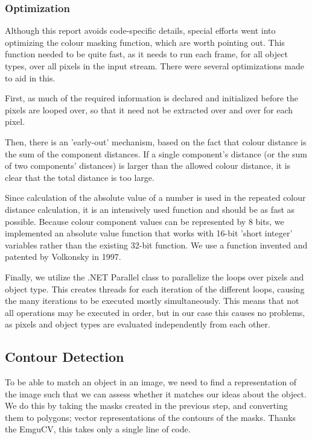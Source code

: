 \documentclass[10pt,twocolumn]{article}
\begin{document}
\subsubsection{Optimization}
Although this report avoids code-specific details, special efforts went into optimizing the colour masking function, which are worth pointing out. This function needed to be quite fast, as it needs to run each frame, for all object types, over all pixels in the input stream. There were several optimizations made to aid in this.

First, as much of the required information is declared and initialized before the pixels are looped over, so that it need not be extracted over and over for each pixel.

Then, there is an 'early-out' mechanism, based on the fact that colour distance is the sum of the component distances. If a single component's distance (or the sum of two components' distances) is larger than the allowed colour distance, it is clear that the total distance is too large.

Since calculation of the absolute value of a number is used in the repeated colour distance calculation, it is an intensively used function and should be as fast as possible. Because colour component values can be represented by 8 bits, we implemented an absolute value function that works with 16-bit 'short integer' variables rather than the existing 32-bit function. We use a function invented and patented by Volkonsky in 1997. %

Finally, we utilize the .NET Parallel class to parallelize the loops over pixels and object type. This creates threads for each iteration of the different loops, causing the many iterations to be executed mostly simultaneously. This means that not all operations may be executed in order, but in our case this causes no problems, as pixels and object types are evaluated independently from each other.

\subsection{Contour Detection}
To be able to match an object in an image, we need to find a representation of the image such that we can assess whether it matches our ideas about the object. We do this by taking the masks created in the previous step, and converting them to polygons; vector representations of the contours of the masks. Thanks the EmguCV, this takes only a single line of code.
\end{document}
